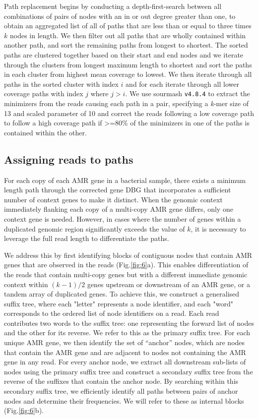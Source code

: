Path replacement begins by conducting a depth-first-search between all combinations of pairs of nodes with an in or out degree greater than one, to obtain an aggregated list of all of paths that are less than or equal to three times $k$ nodes in length. We then filter out all paths that are wholly contained within another path, and sort the remaining paths from longest to shortest. The sorted paths are clustered together based on their start and end nodes and we iterate through the clusters from longest maximum length to shortest and sort the paths in each cluster from highest mean coverage to lowest. We then iterate through all paths in the sorted cluster with index $i$ and for each iterate through all lower coverage paths with index $j$ where $j > i$. We use sourmash \texttt{v4.8.4} \cite{Pierce2019} to extract the minimizers from the reads causing each path in a pair, specifying a \textit{k}-mer size of 13 and scaled parameter of 10 and correct the reads following a low coverage path to follow a high coverage path if >=80\% of the minimizers in one of the paths is contained within the other.

\subsection*{Assigning reads to paths}

For each copy of each AMR gene in a bacterial sample, there exists a minimum length path through the corrected gene DBG that incorporates a sufficient number of context genes to make it distinct. When the genomic context immediately flanking each copy of a multi-copy AMR gene differs, only one context gene is needed. However, in cases where the number of genes within a duplicated genomic region significantly exceeds the value of $k$, it is necessary to leverage the full read length to differentiate the paths. 

We address this by first identifying blocks of contiguous nodes that contain AMR genes that are observed in the reads (Fig.\ref{fig:6}a). This enables differentiation of the reads that contain multi-copy genes but with a different immediate genomic context within $(k - 1) / 2$ genes upstream or downstream of an AMR gene, or a tandem array of duplicated genes. To achieve this, we construct a generalised suffix tree, where each "letter" represents a node identifier, and each "word" corresponds to the ordered list of node identifiers on a read. Each read contributes two words to the suffix tree: one representing the forward list of nodes and the other for its reverse. We refer to this as the primary suffix tree. For each unique AMR gene, we then identify the set of “anchor” nodes, which are nodes that contain the AMR gene and are adjacent to nodes not containing the AMR gene in any read. For every anchor node, we extract all downstream sub-lists of nodes using the primary suffix tree and construct a secondary suffix tree from the reverse of the suffixes that contain the anchor node. By searching within this secondary suffix tree, we efficiently identify all paths between pairs of anchor nodes and determine their frequencies. We will refer to these as internal blocks (Fig.\ref{fig:6}b).

